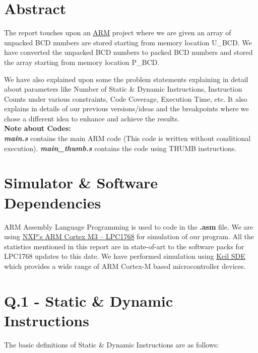 \documentclass[12pt]{article}
\begin{document}
\maketitle


\section{Abstract}
The report touches upon an \href{https://en.wikipedia.org/wiki/ARM_architecture}{ARM} project where we are given an array of unpacked BCD numbers are stored starting from memory location U\_BCD. We have converted the unpacked BCD numbers to packed BCD numbers and stored the array starting from memory location P\_BCD.

We have also explained upon some the problem statements explaining in detail about parameters like Number of Static \& Dynamic Instructions, Instruction Counts under various constraints, Code Coverage, Execution Time, etc. It also explains in details of our previous versions/ideas and the breakpoints where we chose a different idea to enhance and achieve the results. \\


\textbf{Note about Codes:} \\
    \textbf{\textit{main.s}} contains the main ARM code (This code is written without conditional execution). \textbf{\textit{main\_thumb.s}} contains the code using THUMB instructions.

\section{Simulator \& Software Dependencies}

ARM Assembly Language Programming is used to code in the \textbf{.asm} file.
We are using \href{https://www.nxp.com/docs/en/data-sheet/LPC1769_68_67_66_65_64_63.pdf}{NXP’s ARM Cortex M3 – LPC1768} for simulation of our program. All the statistics mentioned in this report are in state-of-art to the software packs for LPC1768 updates to this date.
We have performed simulation using \href{https://www.keil.com}{Keil SDE} which provides a wide range of ARM Cortex-M based microcontroller devices.

\section{Q.1 - Static \& Dynamic Instructions}
The basic definitions of Static \& Dynamic Instructions are as follows: \\
\end{document}
